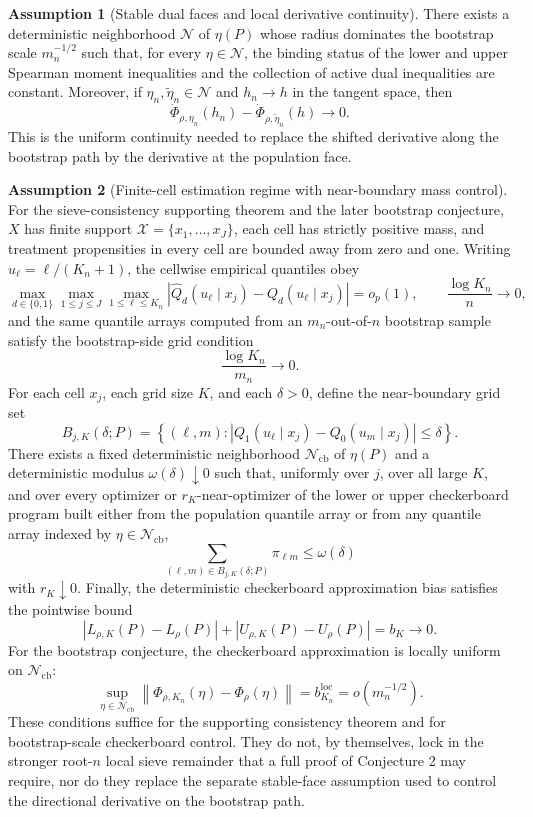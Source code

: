 \documentclass[11pt]{article}
\theoremstyle{definition}
\newtheorem{assumption}{Assumption}
\theoremstyle{plain}
\theoremstyle{remark}
\begin{document}
\begin{assumption}[Stable dual faces and local derivative continuity]\label{ass:stable-dual}
There exists a deterministic neighborhood \(\mathcal N\) of \(\eta(P)\) whose radius dominates the bootstrap scale \(m_n^{-1/2}\) such that, for every \(\eta\in\mathcal N\), the binding status of the lower and upper Spearman moment inequalities and the collection of active dual inequalities are constant.  Moreover, if \(\eta_n,\tilde\eta_n\in\mathcal N\) and \(h_n\to h\) in the tangent space, then
\[
\dot\Phi_{\rho,\eta_n}(h_n)-\dot\Phi_{\rho,\tilde\eta_n}(h)\to 0.
\]
This is the uniform continuity needed to replace the shifted derivative along the bootstrap path by the derivative at the population face.
\end{assumption}

\begin{assumption}[Finite-cell estimation regime with near-boundary mass control]\label{ass:finite-cell}
For the sieve-consistency supporting theorem and the later bootstrap conjecture, \(X\) has finite support \(\mathcal X=\{x_1,\ldots,x_J\}\), each cell has strictly positive mass, and treatment propensities in every cell are bounded away from zero and one.  Writing \(u_\ell=\ell/(K_n+1)\), the cellwise empirical quantiles obey
\[
\max_{d\in\{0,1\}}\max_{1\le j\le J}\max_{1\le \ell\le K_n}
\left|\widehat Q_d(u_\ell\mid x_j)-Q_d(u_\ell\mid x_j)\right|=o_p(1),
\qquad \frac{\log K_n}{n}\to0,
\]
and the same quantile arrays computed from an \(m_n\)-out-of-\(n\) bootstrap sample satisfy the bootstrap-side grid condition
\[
\frac{\log K_n}{m_n}\to0.
\]
For each cell \(x_j\), each grid size \(K\), and each \(\delta>0\), define the near-boundary grid set
\[
B_{j,K}(\delta;P)=\left\{(\ell,m):\left|Q_1(u_\ell\mid x_j)-Q_0(u_m\mid x_j)\right|\le \delta\right\}.
\]
There exists a fixed deterministic neighborhood \(\mathcal N_{\mathrm{cb}}\) of \(\eta(P)\) and a deterministic modulus \(\omega(\delta)\downarrow0\) such that, uniformly over \(j\), over all large \(K\), and over every optimizer or \(r_K\)-near-optimizer of the lower or upper checkerboard program built either from the population quantile array or from any quantile array indexed by \(\eta\in\mathcal N_{\mathrm{cb}}\),
\[
\sum_{(\ell,m)\in B_{j,K}(\delta;P)}\pi_{\ell m}\le \omega(\delta)
\]
with \(r_K\downarrow0\).  Finally, the deterministic checkerboard approximation bias satisfies the pointwise bound
\[
\left|L_{\rho,K}(P)-L_\rho(P)\right|+\left|U_{\rho,K}(P)-U_\rho(P)\right|=b_K\to0.
\]
For the bootstrap conjecture, the checkerboard approximation is locally uniform on \(\mathcal N_{\mathrm{cb}}\):
\[
\sup_{\eta\in\mathcal N_{\mathrm{cb}}}\left\|\Phi_{\rho,K_n}(\eta)-\Phi_\rho(\eta)\right\|=b_{K_n}^{\mathrm{loc}}=o(m_n^{-1/2}).
\]
These conditions suffice for the supporting consistency theorem and for bootstrap-scale checkerboard control.  They do not, by themselves, lock in the stronger root-\(n\) local sieve remainder that a full proof of Conjecture 2 may require, nor do they replace the separate stable-face assumption used to control the directional derivative on the bootstrap path.
\end{assumption}
\end{document}
